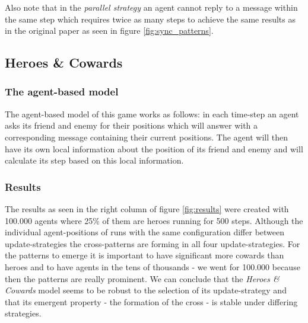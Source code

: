 Also note that in the \textit{parallel strategy} an agent cannot reply to a message within the same step which requires twice as many steps to achieve the same results as in the original paper as seen in figure \ref{fig:sync_patterns}.

\subsection{Heroes \& Cowards}
\subsubsection{The agent-based model}
The agent-based model of this game works as follows: in each time-step an agent asks its friend and enemy for their positions which will answer with a corresponding message containing their current positions. The agent will then have its own local information about the position of its friend and enemy and will calculate its step based on this local information.

\subsubsection{Results}
The results as seen in the right column of figure \ref{fig:results} were created with 100.000 agents where 25\% of them are heroes running for 500 steps. Although the individual agent-positions of runs with the same configuration differ between update-strategies the cross-patterns are forming in all four update-strategies. For the patterns to emerge it is important to have significant more cowards than heroes and to have agents in the tens of thousands - we went for 100.000 because then the patterns are really prominent. We can conclude that the \textit{Heroes \& Cowards} model seems to be robust to the selection of its update-strategy and that its emergent property - the formation of the cross - is stable under differing strategies.